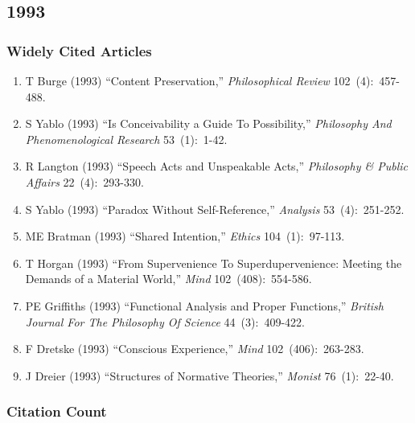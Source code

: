 \documentclass[
  10pt,
  letterpaper,
  DIV=11,
  numbers=noendperiod,
  twoside]{scrartcl}
\providecommand{\tightlist}{%
  \setlength{\itemsep}{0pt}\setlength{\parskip}{0pt}}\usepackage{longtable,booktabs,array}
\begin{document}
\newpage

\subsection{1993}\label{sec-s1993}

\subsubsection*{Widely Cited Articles}\label{widely-cited-articles-36}

\begin{enumerate}
\def\labelenumi{\arabic{enumi}.}
\tightlist
\item
  T Burge (1993) ``Content Preservation,'' \emph{Philosophical Review}
  102~(4):~457-488.
\item
  S Yablo (1993) ``Is Conceivability a Guide To Possibility,''
  \emph{Philosophy And Phenomenological Research} 53~(1):~1-42.
\item
  R Langton (1993) ``Speech Acts and Unspeakable Acts,''
  \emph{Philosophy \& Public Affairs} 22~(4):~293-330.
\item
  S Yablo (1993) ``Paradox Without Self-Reference,'' \emph{Analysis}
  53~(4):~251-252.
\item
  ME Bratman (1993) ``Shared Intention,'' \emph{Ethics} 104~(1):~97-113.
\item
  T Horgan (1993) ``From Supervenience To Superdupervenience: Meeting
  the Demands of a Material World,'' \emph{Mind} 102~(408):~554-586.
\item
  PE Griffiths (1993) ``Functional Analysis and Proper Functions,''
  \emph{British Journal For The Philosophy Of Science} 44~(3):~409-422.
\item
  F Dretske (1993) ``Conscious Experience,'' \emph{Mind}
  102~(406):~263-283.
\item
  J Dreier (1993) ``Structures of Normative Theories,'' \emph{Monist}
  76~(1):~22-40.
\end{enumerate}

\subsubsection*{Citation Count}\label{sec-count-1993}
\end{document}
